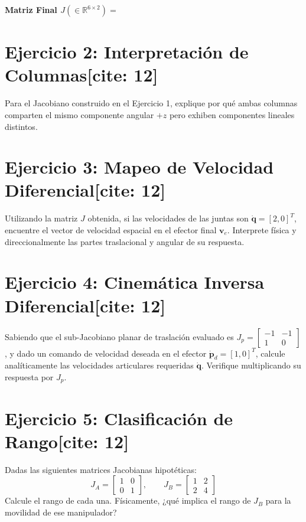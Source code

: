 \documentclass[11pt, a4paper]{article}
\begin{document}
\vspace{0.4cm}
\textbf{Matriz Final $J (\in \mathbb{R}^{6 \times 2}) =$ } \underline{\hspace{8cm}}

\section*{Ejercicio 2: Interpretación de Columnas[cite: 12]}
Para el Jacobiano construido en el Ejercicio 1, explique por qué ambas columnas comparten el mismo componente angular $+z$ pero exhiben componentes lineales distintos.
\vspace{2cm}

\section*{Ejercicio 3: Mapeo de Velocidad Diferencial[cite: 12]}
Utilizando la matriz $J$ obtenida, si las velocidades de las juntas son $\dot{\mathbf{q}} = [2, 0]^T$, encuentre el vector de velocidad espacial en el efector final $\mathbf{v}_e$. Interprete física y direccionalmente las partes traslacional y angular de su respuesta.
\vspace{3cm}

\section*{Ejercicio 4: Cinemática Inversa Diferencial[cite: 12]}
Sabiendo que el sub-Jacobiano planar de traslación evaluado es $J_p = \begin{bmatrix} -1 & -1 \\ 1 & 0 \end{bmatrix}$, y dado un comando de velocidad deseada en el efector $\dot{\mathbf{p}}_d = [1, 0]^T$, calcule analíticamente las velocidades articulares requeridas $\dot{\mathbf{q}}$. Verifique multiplicando su respuesta por $J_p$.
\vspace{4cm}

\section*{Ejercicio 5: Clasificación de Rango[cite: 12]}
Dadas las siguientes matrices Jacobianas hipotéticas:
\begin{equation*}
    J_A = \begin{bmatrix} 1 & 0 \\ 0 & 1 \end{bmatrix}, \qquad J_B = \begin{bmatrix} 1 & 2 \\ 2 & 4 \end{bmatrix}
\end{equation*}
Calcule el rango de cada una. Físicamente, ¿qué implica el rango de $J_B$ para la movilidad de ese manipulador?
\vspace{2.5cm}
\end{document}
